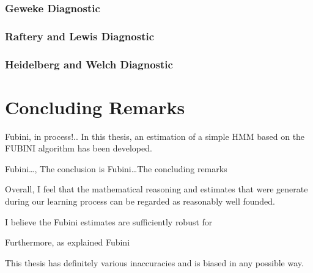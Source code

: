\documentclass[a4paper,11pt,english]{article}
\begin{document}
			\subsubsection{Geweke Diagnostic}
	
			\subsubsection{Raftery and Lewis Diagnostic}
	
			\subsubsection{Heidelberg and Welch Diagnostic}


	\section{Concluding Remarks}

	Fubini, in process!.. In this thesis, an estimation of a simple HMM based on the FUBINI algorithm has been developed.
	
	\noindent Fubini\ldots, The conclusion is Fubini\ldots The concluding remarks
	
	Overall, I feel that the mathematical reasoning and estimates that were generate during our learning process can be regarded as reasonably well 
	founded. 
	
	I believe the Fubini estimates are sufficiently robust for
	
	Furthermore, as explained Fubini
	
	This thesis has definitely various inaccuracies and is biased in any possible way. \\
	
\end{document}
